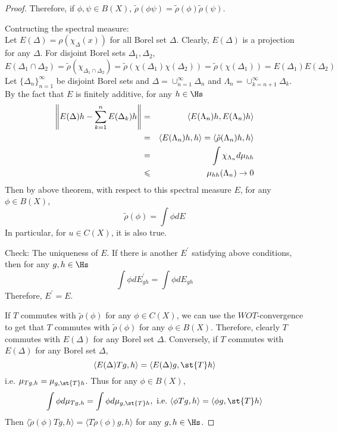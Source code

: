 \begin{proof}
	Therefore, if $\phi,\psi \in B(X)$, $\tilde{\rho}(\phi\psi) = \tilde{\rho}(\phi)\tilde{\rho}(\psi)$.
	\item Contructing the spectral measure: \\
	Let $E(\Delta) = \rho(\chi_{\Delta}(x))$ for all Borel set $\Delta$. Clearly, $E(\Delta)$ is a projection for any $\Delta$. For disjoint Borel sets $\Delta_1, \Delta_2$,
	\begin{equation*}
		E(\Delta_1 \cap \Delta_2) = \tilde{\rho}(\chi_{\Delta_1 \cap \Delta_2}) = \tilde{\rho}(\chi(\Delta_1)\chi(\Delta_2)) =\tilde{\rho}(\chi(\Delta_1)) = E(\Delta_1)E(\Delta_2)
	\end{equation*}
	Let $\{\Delta_n\}_{n=1}^{\infty}$ be disjoint Borel sets and $\Delta = \cup_{n=1}^{\infty}\Delta_n$ and $\Lambda_n = \cup_{k=n+1}^{\infty}\Delta_k$. By the fact that $E$ is finitely additive, for any $h \in \Hs$
	\begin{eqnarray*}
	\left\lVert E(\Delta)h-\sum_{k=1}^{n}E(\Delta_k)h\right\lVert &=& \langle E(\Lambda_n)h, E(\Lambda_n)h \rangle \\
	&=& \langle E(\Lambda_n)h, h \rangle = \langle \tilde{\rho}(\Lambda_n)h, h \rangle \\
	&=& \int \chi_{\Lambda_n} d\mu_{hh} \\
	&\leqslant& \mu_{hh}(\Lambda_n) \rightarrow 0
	\end{eqnarray*}
	Then by above theorem, with respect to this spectral measure $E$, for any $\phi \in B(X)$,
	\begin{equation*}
		\tilde{\rho}(\phi) = \int \phi dE
	\end{equation*}
	In particular, for $u \in C(X)$, it is also true.
	\item Check: The uniqueness of $E$.
	If there is another $E^{'}$ satisfying above conditions, then for any $g,h \in \Hs$
	\begin{equation*}
		\int \phi dE^{'}_{gh} = \int \phi dE_{gh}
	\end{equation*}
	Therefore, $E^{'} = E$.
	\item If $T$ commutes with $\tilde{\rho}(\phi)$ for any $\phi \in C(X)$, we can use the $WOT$-convergence to get that $T$ commutes with $\tilde{\rho}(\phi)$ for any $\phi \in B(X)$. Therefore, clearly $T$ commutes with $E(\Delta)$ for any Borel set $\Delta$. Conversely, if $T$ commutes with $E(\Delta)$ for any Borel set $\Delta$, 
	\begin{equation*}
		\langle E(\Delta)Tg,h \rangle = \langle E(\Delta)g,\st{T}h \rangle
	\end{equation*}
	i.e. $\mu_{Tg,h} = \mu_{g, \st{T}h}$. Thus for any $\phi \in B(X)$,
	\begin{equation*}
		\int \phi d\mu_{Tg,h} = \int \phi d\mu_{g,\st{T}h},~\text{i.e.}~\langle \phi Tg,h \rangle = \langle \phi g,\st{T}h \rangle
	\end{equation*}
	Then $\langle \tilde{\rho}(\phi) Tg,h \rangle = \langle T \tilde{\rho}(\phi) g,h \rangle$ for any $g,h \in \Hs$.
\end{proof}
